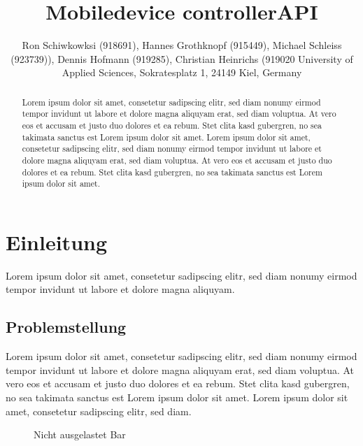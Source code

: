 \documentclass[a4paper]{spie}  %
\title{Mobiledevice controllerAPI} %
\author{ Ron Schiwkowksi  (918691), Hannes Grothknopf (915449), Michael Schleiss (923739)), Dennis Hofmann (919285), Christian Heinrichs (919020
\skiplinehalf
University of Applied Sciences, Sokratesplatz 1, 24149 Kiel, Germany
}
\begin{document}
 
  \maketitle 
\begin{abstract} %
Lorem ipsum dolor sit amet, consetetur sadipscing elitr, sed diam nonumy eirmod tempor invidunt ut labore et dolore magna aliquyam erat, sed diam voluptua. At vero eos et accusam et justo duo dolores et ea rebum. Stet clita kasd gubergren, no sea takimata sanctus est Lorem ipsum dolor sit amet. Lorem ipsum dolor sit amet, consetetur sadipscing elitr, sed diam nonumy eirmod tempor invidunt ut labore et dolore magna aliquyam erat, sed diam voluptua. At vero eos et accusam et justo duo dolores et ea rebum. Stet clita kasd gubergren, no sea takimata sanctus est Lorem ipsum dolor sit amet.
\end{abstract}


\section{Einleitung} %
Lorem ipsum dolor sit amet, consetetur sadipscing elitr, sed diam nonumy eirmod tempor invidunt ut labore et dolore magna aliquyam.

\subsection{Problemstellung}
Lorem ipsum dolor sit amet, consetetur sadipscing elitr, sed diam nonumy eirmod tempor invidunt ut labore et dolore magna aliquyam erat, sed diam voluptua. At vero eos et accusam et justo duo dolores et ea rebum. Stet clita kasd gubergren, no sea takimata sanctus est Lorem ipsum dolor sit amet. Lorem ipsum dolor sit amet, consetetur sadipscing elitr, sed diam.
\begin{figure}[h!]
	\centering
		\caption{Nicht ausgelastet Bar}
		\label{fig:FrontendInit}
\end{figure}
\end{document}
